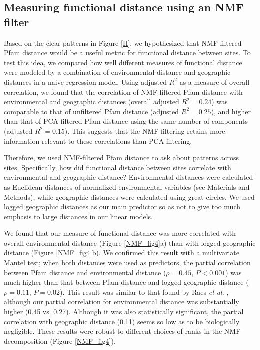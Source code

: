 
\subsection{Measuring functional distance using an NMF filter}

Based on the clear patterns in Figure \ref{H}, we hypothesized that NMF-filtered Pfam distance would be a useful metric for functional distance between sites. To test this idea, we compared how well different measures of functional distance were modeled by a combination of environmental distance and geographic distances in a naive regression model.  Using adjusted $R^2$ as a measure of overall correlation, we found that the correlation of NMF-filtered Pfam distance with environmental and geographic distances (overall adjusted $R^2 = 0.24$) was comparable to that of unfiltered Pfam distance (adjusted $R^2 = 0.25$), and higher than that of PCA-filtered Pfam distance using the same number of components (adjusted $R^2 = 0.15$). This suggests that the NMF filtering retains more information relevant to these correlations than PCA filtering.

Therefore, we used NMF-filtered Pfam distance to ask about patterns across sites. Specifically, how did functional distance between sites correlate with environmental and geographic distance?  Environmental distances were calculated as Euclidean distances of normalized environmental variables (see Materials and Methods), while geographic distances were calculated using great circles. We used logged geographic distances as our main predictor so as not to give too much emphasis to large distances in our linear models.

We found that our measure of functional distance was more correlated with overall environmental distance (Figure \ref{NMF_fig4}a) than with logged geographic distance (Figure \ref{NMF_fig4}b). We confirmed this result with a multivariate Mantel test; when both distances were used as predictors, the partial correlation between Pfam distance and environmental distance ($\rho=0.45$, $P < 0.001$) was much higher than that between Pfam distance and logged geographic distance ($\rho=0.11$, $P=0.02$). This result was similar to that found by Raes {\em et al.} \cite{raes_toward_2011}, although our partial correlation for environmental distance was substantially higher (0.45 vs. 0.27).  Although it was also statistically significant, the partial correlation with geographic distance (0.11) seems so low as to be biologically negligible. These results were robust to different choices of ranks in the NMF decomposition (Figure \ref{NMF_fig4}).

